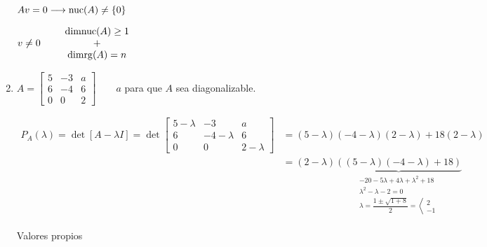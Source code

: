 \begin{enumerate}[label=\color{red}\textbf{\arabic*)}, leftmargin=*]
	$Av=0\longrightarrow\operatorname{\mathrm{nuc}}(A)\neq\{0\}$
	
	$v\neq0\qquad\begin{array}{c}
		\operatorname{\mathrm{dimnuc}}(A)\ge1\\
		+\\
		\operatorname{\mathrm{dimrg}}(A)=n
	\end{array}$
	
	
	\item {}
	
	$A=\begin{bmatrix}
		5 & -3 & a \\
		6 & -4 & 6 \\
		0 & 0 & 2
	\end{bmatrix}\qquad a$ para que $A$ sea diagonalizable.
	
	$\begin{aligned}
		P_A(\lambda)=\det[A-\lambda I]=\det\begin{bmatrix}
			5-\lambda & -3 & a \\
			6 & -4-\lambda & 6 \\
			0 & 0 & 2-\lambda
		\end{bmatrix}&=(5-\lambda)(-4-\lambda)(2-\lambda)+18(2-\lambda)\\
		&=(2-\lambda)\underbrace{\left((5-\lambda)(-4-\lambda)+18\right)}_{\begin{array}{l}
				-20-5\lambda+4\lambda+\lambda^2+18\\
				\lambda^2-\lambda-2=0\\
				\lambda=\dfrac{1\pm\sqrt{1+8}}{2}=\left\langle\begin{array}{l}
					2\\
					-1
				\end{array}\right.
		\end{array}}
	\end{aligned}$
	
	Valores propios
	

\end{enumerate}
